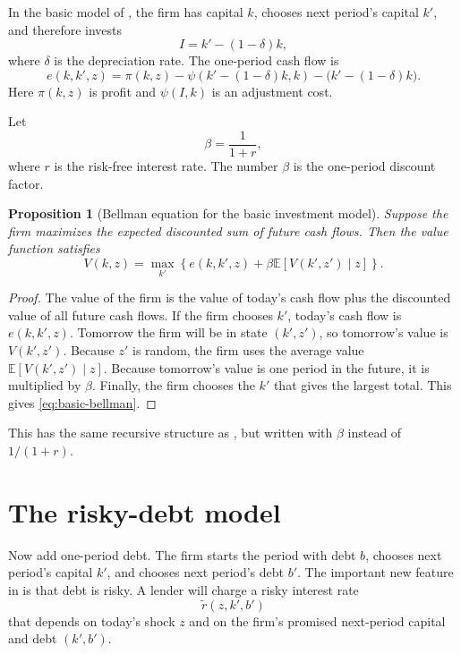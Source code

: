 \documentclass[11pt]{article}
\newtheorem{proposition}{Proposition}
\newcommand{\E}{\mathbb{E}}
\newcommand{\1}{\mathbf{1}}
\begin{document}
In the basic model of \citet[Section 3.1]{strebulaev2012dynamic}, the firm has
capital \(k\), chooses next period's capital \(k'\), and therefore invests
\begin{equation}
  I = k'-(1-\delta)k,
  \label{eq:investment-law}
\end{equation}
where \(\delta\) is the depreciation rate. The one-period cash flow is
\begin{equation}
  e(k,k',z)
  =
  \pi(k,z)-\psi(k'-(1-\delta)k,k)-\bigl(k'-(1-\delta)k\bigr).
  \label{eq:basic-cash-flow}
\end{equation}
Here \(\pi(k,z)\) is profit and \(\psi(I,k)\) is an adjustment cost.

Let
\[
  \beta = \frac{1}{1+r},
\]
where \(r\) is the risk-free interest rate. The number \(\beta\) is the one-period
discount factor.

\begin{proposition}[Bellman equation for the basic investment model]
\label{prop:basic-bellman}
Suppose the firm maximizes the expected discounted sum of future cash flows.
Then the value function satisfies
\begin{equation}
  V(k,z)
  =
  \max_{k'}
  \left\{
    e(k,k',z)
    +\beta \E[V(k',z')\mid z]
  \right\}.
  \label{eq:basic-bellman}
\end{equation}
\end{proposition}

\begin{proof}
The value of the firm is the value of today's cash flow plus the discounted
value of all future cash flows. If the firm chooses \(k'\), today's cash flow is
\(e(k,k',z)\). Tomorrow the firm will be in state \((k',z')\), so tomorrow's
value is \(V(k',z')\). Because \(z'\) is random, the firm uses the average value
\(\E[V(k',z')\mid z]\). Because tomorrow's value is one period in the future, it
is multiplied by \(\beta\). Finally, the firm chooses the \(k'\) that gives the
largest total. This gives \cref{eq:basic-bellman}.
\end{proof}

This has the same recursive structure as
\citet[eq. (3.10)]{strebulaev2012dynamic}, but written with \(\beta\) instead
of \(1/(1+r)\).

\section{The risky-debt model}

Now add one-period debt. The firm starts the period with debt \(b\), chooses next
period's capital \(k'\), and chooses next period's debt \(b'\). The important new
feature in \citet[Section 3.6]{strebulaev2012dynamic} is that debt is risky. A
lender will charge a risky interest rate
\[
  \widetilde r(z,k',b')
\]
that depends on today's shock \(z\) and on the firm's promised next-period
capital and debt \((k',b')\).
\end{document}
